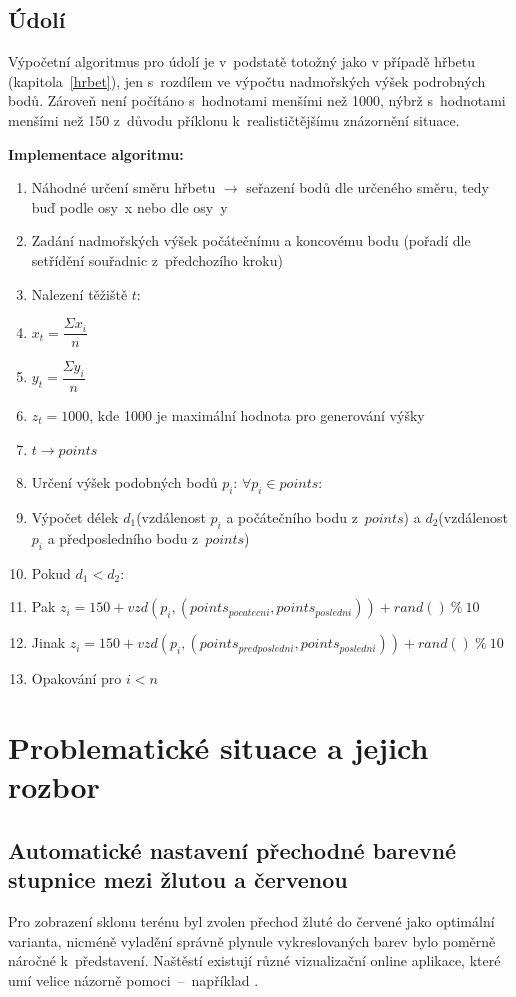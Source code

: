 \documentclass[a4paper, 12pt, oneside, titlepage]{article} %
\begin{document}
\subsection{Údolí}
Výpočetní algoritmus pro údolí je v~podstatě totožný jako v případě hřbetu (kapitola~\ref{hrbet}), jen s~rozdílem ve výpočtu nadmořských výšek podrobných bodů. Zároveň není počítáno s~hodnotami menšími než 1000, nýbrž s~hodnotami menšími než 150 z~důvodu příklonu k~realističtějšímu znázornění situace.

\textbf{Implementace algoritmu:}
\begin{enumerate}
\item Náhodné určení směru hřbetu $\rightarrow$ seřazení bodů dle určeného směru, tedy buď podle osy~x nebo dle osy~y
\item Zadání nadmořských výšek počátečnímu a koncovému bodu (pořadí dle setřídění souřadnic z~předchozího kroku)
\item Nalezení těžiště $t$:
\item \quad $x_t= \dfrac{\Sigma x_i}{n}$ 
\item \quad $y_t= \dfrac{\Sigma y_i}{n}$
\item \quad $z_t= 1000$, kde 1000 je maximální hodnota pro generování výšky
\item $t \rightarrow points$
\item Určení výšek podobných bodů $p_i$: $\forall p_i \in points $:
\item \quad Výpočet délek $d_1$(vzdálenost $p_i$ a počátečního bodu z~$points$) a $d_2$(vzdálenost $p_i$ a předposledního bodu z~$points$) 
\item \quad Pokud $d_1<d_2$:
\item \quad \quad Pak $z_i=150+vzd(p_i,(points_{pocatecni},points_{posledni}))+rand()~\%~10$
\item \quad \quad Jinak $z_i=150+vzd(p_i,(points_{predposledni},points_{posledni}))+rand()~\%~10$
\item Opakování pro $i<n$
\end{enumerate}

\section{Problematické situace a jejich rozbor} \label{problemrozbor}
\subsection{Automatické nastavení přechodné barevné stupnice mezi žlutou a červenou}
Pro zobrazení sklonu terénu byl zvolen přechod žluté do červené jako optimální varianta, nicméně vyladění správně plynule vykreslovaných barev bylo poměrně náročné k~představení. Naštěstí existují různé vizualizační online aplikace, které umí velice názorně pomoci~--~například \cite{rgbcol}.
\end{document}

